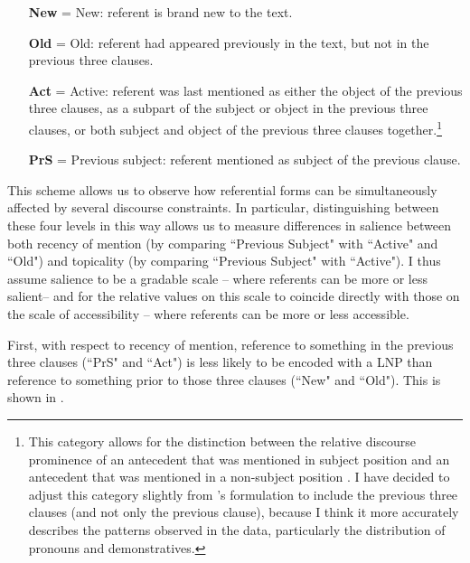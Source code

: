 \begin{itemize}
\item[\textbf{New}] = New: referent is brand new to the text.

\item[\textbf{Old}] = Old: referent had appeared previously in the text, but not in the previous three clauses.

\item[\textbf{Act}] = Active: referent was last mentioned as either the object of the previous three clauses, as a subpart of the subject or object in the previous three clauses, or both subject and object of the previous three clauses together.\footnote{This category allows for the distinction between the relative discourse prominence of an antecedent that was mentioned in subject position and an antecedent that was mentioned in a non-subject position \citep[226]{arnold2003}. I have decided to adjust this category slightly from \citet[231]{arnold2003}'s formulation to include the previous three clauses (and not only the previous clause), because I think it more accurately describes the patterns observed in the data, particularly the distribution of pronouns and demonstratives.}

\item[\textbf{PrS}] = Previous subject: referent mentioned as subject of the previous clause.
\end{itemize}

\z
This scheme allows us to observe how referential forms can be simultaneously affected by several discourse constraints. In particular, distinguishing between these four levels in this way allows us to measure differences in salience between both recency of mention (by comparing ``Previous Subject" with ``Active" and ``Old") and topicality (by comparing ``Previous Subject" with ``Active"). I thus assume salience to be a gradable scale \citep{hopper1980} -- where referents can be more or less salient-- and for the relative values on this scale to coincide directly with those on the scale of accessibility -- where referents can be more or less accessible. 

First, with respect to recency of mention, reference to something in the previous three clauses (``PrS" and ``Act") is less likely to be encoded with a LNP than reference to something prior to those three clauses (``New" and ``Old"). This is shown in .

